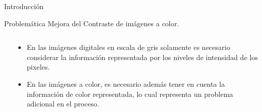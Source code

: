 \documentclass[usenames,dvipsnames]{beamer}
\begin{document}


\begin{frame}{Introducción}
\begin{alertblock}{Problemática}
Mejora del Contraste de imágenes a color.
\end{alertblock}

\begin{columns}[t]
\begin{column}{.3\textwidth}

\end{column}
\begin{column}{.7\textwidth}
\begin{itemize}
	\item En las imágenes digitales en escala de gris solamente es necesario considerar la información representada por los niveles de intensidad de los pixeles.
	\item En las imágenes a color, es necesario además tener en cuenta la información de color representada, lo cual representa un problema adicional en el proceso.
\end{itemize}
\end{column}
\end{columns}
\end{frame}
\end{document}
